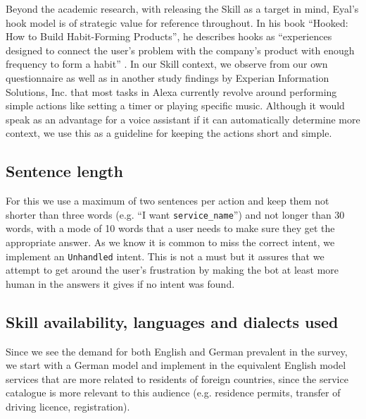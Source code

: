 Beyond the academic research, with releasing the Skill as a target in mind, Eyal's hook model \cite{medium:skillmarketing} is of strategic value for reference throughout. In his book ``Hooked: How to Build Habit-Forming Products'', he describes hooks as “experiences designed to connect the user’s problem with the company’s product with enough frequency to form a habit'' \cite{eyal:hook}.
%
%
%
In our Skill context, we observe from our own questionnaire as well as in another study findings by Experian Information Solutions, Inc. \cite{experian} that 
most tasks in Alexa currently revolve around performing simple actions like setting a timer or playing specific music.
Although it would speak as an advantage for a voice assistant if it can automatically determine more context, we use this as a guideline for keeping the actions short and simple.

\subsection*{Sentence length}
For this we use a maximum of two sentences per action and keep them not shorter than three words (e.g. ``I want \texttt{service_name}'') and not longer than 30 words, with a mode of 10 words that a user needs to make sure they get the appropriate answer.
As we know it is common to miss the correct intent, we implement an  \texttt{Unhandled} intent. This is not a must but it assures that we 
attempt to get around the user's frustration by making the bot at least more human in the answers it gives if no intent was found.	

\subsection*{Skill availability,  languages and dialects used}
Since we see the demand for both English and German prevalent in the survey, we start with a German model and implement in the equivalent English model services that are more related to residents of foreign countries, since the service catalogue is more relevant to this audience (e.g. residence permits, transfer of driving licence, registration).



